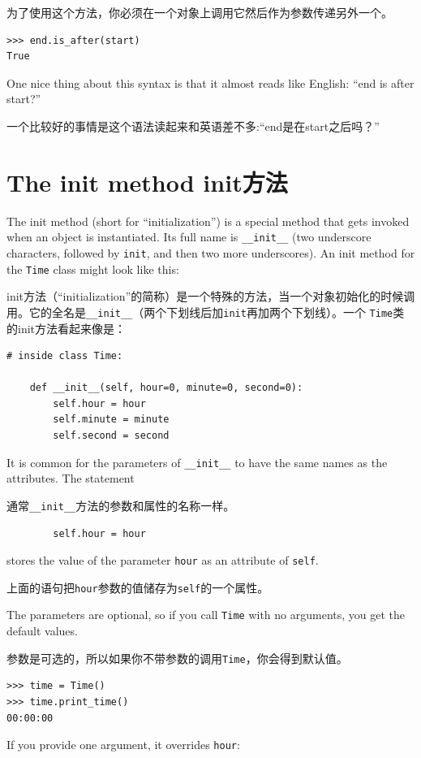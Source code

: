\documentclass[10pt]{book}
\begin{document}
\begin{CJK}{UTF8}{gbsn}
为了使用这个方法，你必须在一个对象上调用它然后作为参数传递另外一个。

\begin{verbatim}
>>> end.is_after(start)
True
\end{verbatim}
%
One nice thing about this syntax is that it almost reads
like English: ``end is after start?''

一个比较好的事情是这个语法读起来和英语差不多:``end是在start之后吗？''


\section{The init method init方法}

The init method (short for ``initialization'') is
a special method that gets invoked when an object is instantiated.  
Its full name is \verb"__init__" (two underscore characters,
followed by {\tt init}, and then two more underscores).  An
init method for the {\tt Time} class might look like this:

init方法（``initialization''的简称）是一个特殊的方法，当一个对象初始化的时候调
用。它的全名是\verb"__init__"（两个下划线后加{\tt init}再加两个下划线）。一个
{\tt Time}类的init方法看起来像是：

\begin{verbatim}
# inside class Time:

    def __init__(self, hour=0, minute=0, second=0):
        self.hour = hour
        self.minute = minute
        self.second = second
\end{verbatim}
%
It is common for the parameters of \verb"__init__"
to have the same names as the attributes.  The statement

通常\verb"__init__"方法的参数和属性的名称一样。

\begin{verbatim}
        self.hour = hour
\end{verbatim}
%
stores the value of the parameter {\tt hour} as an attribute
of {\tt self}.

上面的语句把{\tt hour}参数的值储存为{\tt self}的一个属性。

The parameters are optional, so if you call {\tt Time} with
no arguments, you get the default values.

参数是可选的，所以如果你不带参数的调用{\tt Time}，你会得到默认值。

\begin{verbatim}
>>> time = Time()
>>> time.print_time()
00:00:00
\end{verbatim}
%
If you provide one argument, it overrides {\tt hour}:


\end{CJK}
\end{document}
